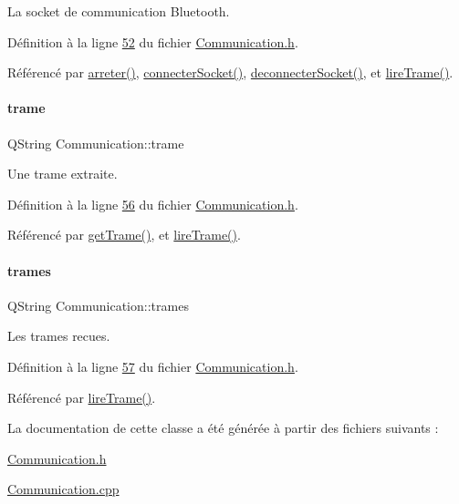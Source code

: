 La socket de communication Bluetooth. 



Définition à la ligne \hyperlink{_communication_8h_source_l00052}{52} du fichier \hyperlink{_communication_8h_source}{Communication.\+h}.



Référencé par \hyperlink{_communication_8cpp_source_l00099}{arreter()}, \hyperlink{_communication_8cpp_source_l00116}{connecter\+Socket()}, \hyperlink{_communication_8cpp_source_l00133}{deconnecter\+Socket()}, et \hyperlink{_communication_8cpp_source_l00173}{lire\+Trame()}.

\mbox{\label{class_communication_ac8f5004bfaaf7f538ba5ae93255f772b}} 
\paragraph{\texorpdfstring{trame}{trame}}
{\footnotesize\ttfamily Q\+String Communication\+::trame\hspace{0.3cm}{\ttfamily [private]}}



Une trame extraite. 



Définition à la ligne \hyperlink{_communication_8h_source_l00056}{56} du fichier \hyperlink{_communication_8h_source}{Communication.\+h}.



Référencé par \hyperlink{_communication_8cpp_source_l00252}{get\+Trame()}, et \hyperlink{_communication_8cpp_source_l00173}{lire\+Trame()}.

\mbox{\label{class_communication_a89b75dc8f2d3427478660b45c01f4186}} 
\paragraph{\texorpdfstring{trames}{trames}}
{\footnotesize\ttfamily Q\+String Communication\+::trames\hspace{0.3cm}{\ttfamily [private]}}



Les trames recues. 



Définition à la ligne \hyperlink{_communication_8h_source_l00057}{57} du fichier \hyperlink{_communication_8h_source}{Communication.\+h}.



Référencé par \hyperlink{_communication_8cpp_source_l00173}{lire\+Trame()}.



La documentation de cette classe a été générée à partir des fichiers suivants \+:\begin{DoxyCompactItemize}
\item 
\hyperlink{_communication_8h}{Communication.\+h}\item 
\hyperlink{_communication_8cpp}{Communication.\+cpp}\end{DoxyCompactItemize}
